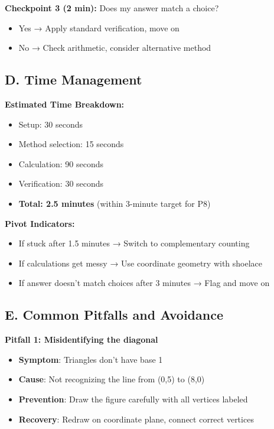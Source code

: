 \documentclass[11pt]{article}
\begin{document}
\begin{roadmapbox}
\textbf{Checkpoint 3 (2 min):} Does my answer match a choice?
\begin{itemize}
    \item Yes → Apply standard verification, move on
    \item No → Check arithmetic, consider alternative method
\end{itemize}

\subsection*{D. Time Management}

\textbf{Estimated Time Breakdown:}
\begin{itemize}
    \item Setup: 30 seconds
    \item Method selection: 15 seconds
    \item Calculation: 90 seconds
    \item Verification: 30 seconds
    \item \textbf{Total: 2.5 minutes} (within 3-minute target for P8)
\end{itemize}

\textbf{Pivot Indicators:}
\begin{itemize}
    \item If stuck after 1.5 minutes → Switch to complementary counting
    \item If calculations get messy → Use coordinate geometry with shoelace
    \item If answer doesn't match choices after 3 minutes → Flag and move on
\end{itemize}

\subsection*{E. Common Pitfalls and Avoidance}

\textbf{Pitfall 1: Misidentifying the diagonal}
\begin{itemize}
    \item \textbf{Symptom}: Triangles don't have base 1
    \item \textbf{Cause}: Not recognizing the line from (0,5) to (8,0)
    \item \textbf{Prevention}: Draw the figure carefully with all vertices labeled
    \item \textbf{Recovery}: Redraw on coordinate plane, connect correct vertices
\end{itemize}


\end{roadmapbox}
\end{document}
